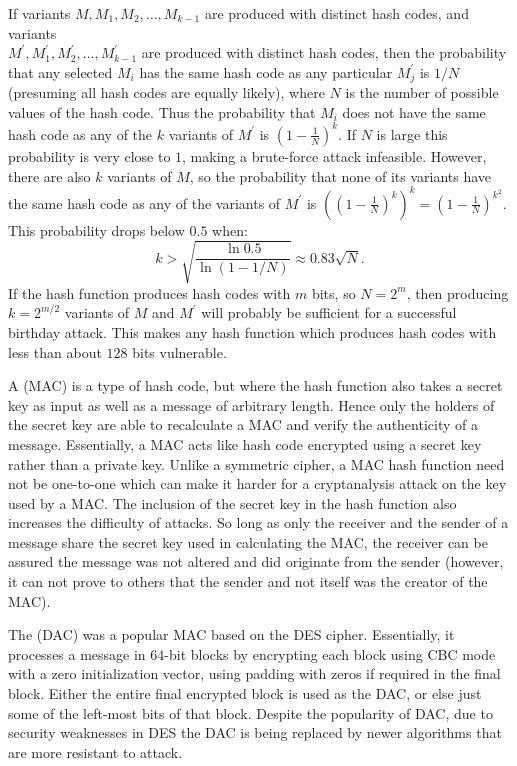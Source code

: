 If variants $M, M_1, M_2, \dots, M_{k-1}$ are produced with distinct hash codes,
and variants\\ $M^\prime, M_1^\prime, M_2^\prime, \dots, M_{k-1}^\prime$ are produced
with distinct hash codes,
then the probability that any selected $M_i$ has the same hash code as any
particular $M_j^\prime$ is $1/N$ (presuming all hash codes are equally likely),
where $N$ is the number of possible values of the hash code.
Thus the probability that $M_i$ does not have the same hash code as any of the
$k$ variants of $M^\prime$ is $\left(1-\frac{1}{N}\right)^k$.
If $N$ is large this probability is very close to $1$, making a brute-force attack infeasible.
However, there are also $k$ variants of $M$, so the probability that none of its variants
have the same hash code as any of the variants of $M^\prime$ is
$\left(\left(1-\frac{1}{N}\right)^k\right)^k=\left(1-\frac{1}{N}\right)^{k^2}$.
This probability drops below $0.5$ when:
\begin{displaymath}
  k > \sqrt{\frac{\ln 0.5}{\ln(1-1/N)}}\approx0.83\sqrt{N}.
\end{displaymath}
If the hash function produces hash codes with $m$ bits, so $N=2^m$, then
producing $k=2^{m/2}$ variants of $M$ and $M^\prime$ will probably be sufficient
for a successful birthday attack. This makes any hash function which produces
hash codes with less than about $128$ bits vulnerable.

A  (MAC) is a type of hash code, but where the
hash function also takes a secret key as input as well as a message of arbitrary length.
Hence only the holders of the secret key are able to recalculate a MAC
and verify the authenticity of a message.
Essentially, a MAC acts like hash code encrypted using a secret key rather than
a private key. Unlike a symmetric cipher, a MAC hash function need not be one-to-one
which can make it harder for a cryptanalysis attack on the key used by a MAC. The inclusion
of the secret key in the hash function also increases the difficulty of attacks.
So long as only the receiver and the sender of a message share the secret key used
in calculating the MAC, the receiver can be assured the message was not altered and
did originate from the sender
(however, it can not prove to others that the sender and not itself was the creator of the MAC).

The  (DAC) was a popular MAC based on the DES cipher.
Essentially, it processes a message in $64$-bit blocks by encrypting each block
using CBC mode with a zero initialization vector, using padding with zeros if
required in the final block.
Either the entire final encrypted block is used as the DAC, or else just some of
the left-most bits of that block.
Despite the popularity of DAC, due to security weaknesses in DES the DAC is
being replaced by newer algorithms that are more resistant to attack.


